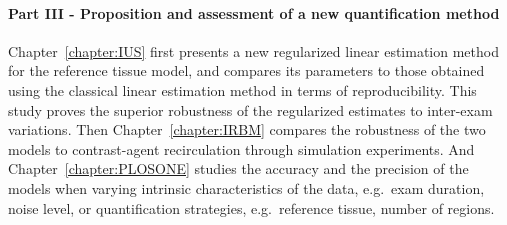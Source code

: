 \paragraph{Part III - Proposition and assessment of a new quantification method}
Chapter~\ref{chapter:IUS} first presents a new regularized linear estimation method for the reference tissue model, and compares its parameters to those obtained using the classical linear estimation method in terms of reproducibility.
This study proves the superior robustness of the regularized estimates to inter-exam variations.
Then Chapter~\ref{chapter:IRBM} compares the robustness of the two models to contrast-agent recirculation through simulation experiments.
And Chapter~\ref{chapter:PLOSONE} studies the accuracy and the precision of the models when varying intrinsic characteristics of the data, e.g.~exam duration, noise level, or quantification strategies, e.g.~reference tissue, number of regions.

\newpage

